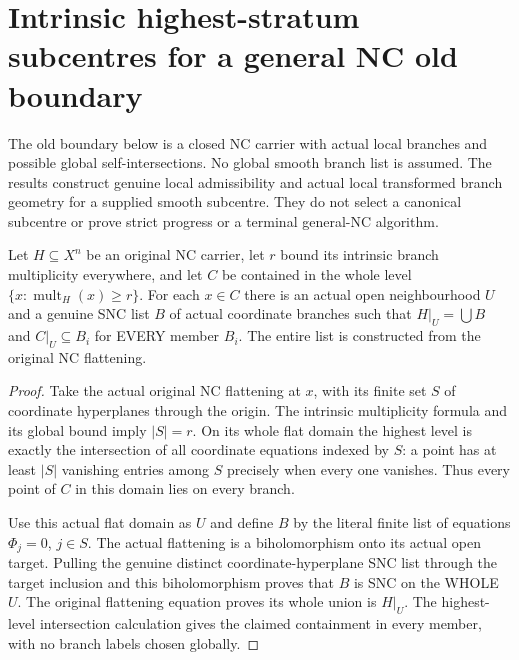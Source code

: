\section{Intrinsic highest-stratum subcentres for a general NC old boundary}
\label{sec:nc-highest-subcentre-admissibility}

The old boundary below is a closed NC carrier with actual local branches and
possible global self-intersections. No global smooth branch list is assumed.
The results construct genuine local admissibility and actual local transformed
branch geometry for a supplied smooth subcentre. They do not select a canonical
subcentre or prove strict progress or a terminal general-NC algorithm.

\begin{theorem}
\label{hir:nc-highest-subcentre-actual-branches}
Let $H\subseteq X^n$ be an original NC carrier, let $r$ bound its intrinsic
branch multiplicity everywhere, and let $C$ be contained in the whole level
$\{x:\operatorname{mult}_H(x)\ge r\}$. For each $x\in C$ there is an actual
open neighbourhood $U$ and a genuine SNC list $B$ of actual coordinate branches
such that $H|_U=\bigcup B$ and $C|_U\subseteq B_i$ for EVERY member $B_i$.
The entire list is constructed from the original NC flattening.
\leanok
\end{theorem}
\begin{proof}
Take the actual original NC flattening at $x$, with its finite set $S$ of
coordinate hyperplanes through the origin. The intrinsic multiplicity formula
and its global bound imply $|S|=r$. On its whole flat domain the highest level
is exactly the intersection of all coordinate equations indexed by $S$:
a point has at least $|S|$ vanishing entries among $S$ precisely when every
one vanishes. Thus every point of $C$ in this domain lies on every branch.

Use this actual flat domain as $U$ and define $B$ by the literal finite list
of equations $\Phi_j=0$, $j\in S$. The actual flattening is a biholomorphism
onto its actual open target. Pulling the genuine distinct coordinate-hyperplane
SNC list through the target inclusion and this biholomorphism proves that
$B$ is SNC on the WHOLE $U$. The original flattening equation proves its
whole union is $H|_U$. The highest-level intersection calculation gives the
claimed containment in every member, with no branch labels chosen globally.
\end{proof}

